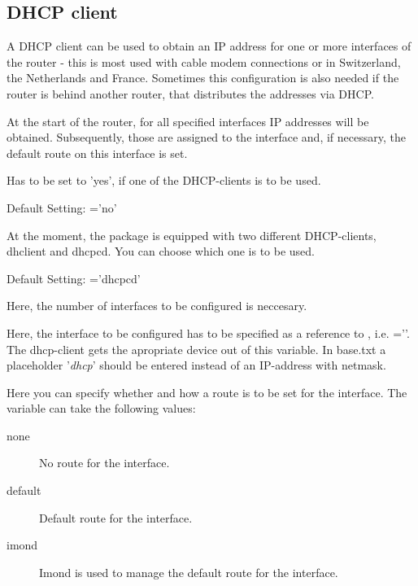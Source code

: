 {
\subsection {DHCP client}
}

A DHCP client can be used to obtain an IP address for one or more
interfaces of the router - this is most used with cable modem
connections or in Switzerland, the Netherlands and France.
Sometimes this configuration is also needed if the router is behind
another router, that distributes the addresses via DHCP.

At the start of the router, for all specified interfaces IP addresses
will be obtained. Subsequently, those are assigned to the interface
and, if necessary, the default route on this interface is set.

\begin{description}

Has to be set to 'yes', if one of the DHCP-clients is to be used.

Default Setting: ='no'


At the moment, the package is equipped with two different DHCP-clients,
dhclient and dhcpcd. You can choose which one is to be used.

Default Setting: ='dhcpcd'


Here, the number of interfaces to be configured is neccesary.


Here, the interface to be configured has to be specified as
a reference to ,
i.e. =''. The
dhcp-client gets the apropriate device out of this variable.
In base.txt a placeholder '\emph{dhcp}' should be entered instead
of an IP-address with netmask.


Here you can specify whether and how a route is to be set for the
interface. The variable can take the following values:
\begin{description}
\item[none] No route for the interface.
\item[default] Default route for the interface.
\item[imond] Imond is used to manage the default route for the interface.
\end{description}


\end{description}
